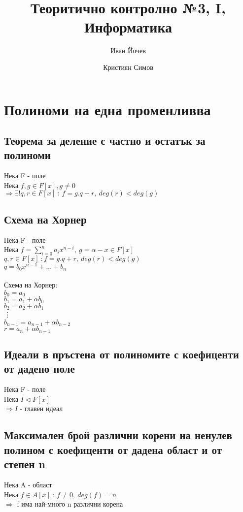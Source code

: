 \documentclass[12pt]{article}
\title{Теоритично контролно №3, I, Информатика}
\author{Иван Йочев \and Кристиян Симов}
\begin{document}
\maketitle

\section{Полиноми на една променливва}

\subsection{Теорема за деление с частно и остатък за полиноми}

Нека F - поле\\
Нека $f,g \in F[x], g \neq 0$ \\
$\Rightarrow \exists! q,r \in F[x]\ :\ f=g.q + r,\ deg(r) < deg(g)$\\

\subsection{Схема на Хорнер}

Нека F - поле \\
Нека $f = \sum\limits_{i=0}^{n} a_ix^{n-i},\ g = \alpha - x \in F[x]$\\
$  q,r \in F[x]\ : f=g.q + r ,\ deg(r) < deg(g)$ \\
$q = b_0x^{n-1}+...+b_n$\\\\
Схема на Хорнер: \\
$b_0 = a_0$ \\
$b_1 = a_1 + \alpha b_0$ \\
$b_2 = a_2 + \alpha b_1$ \\
\vdots \\
$b_{n-1} = a_{n-1} + \alpha b_{n-2}$\\
$r = a_n + \alpha b_{n-1}$

\subsection{Идеали в пръстена от полиномите с коефиценти от дадено поле}
Нека F - поле \\
Нека $I \triangleleft F[x]$ \\
$\Rightarrow I$ - главен идеал

\subsection{Максимален брой различни корени на ненулев полином с коефиценти от дадена област и от степен n}
Нека A - област \\
Нека $f \in A[x]\ :\ f \neq 0,\ deg(f) = n$ \\
$\Rightarrow$ f има най-много n различни корена
\end{document}
